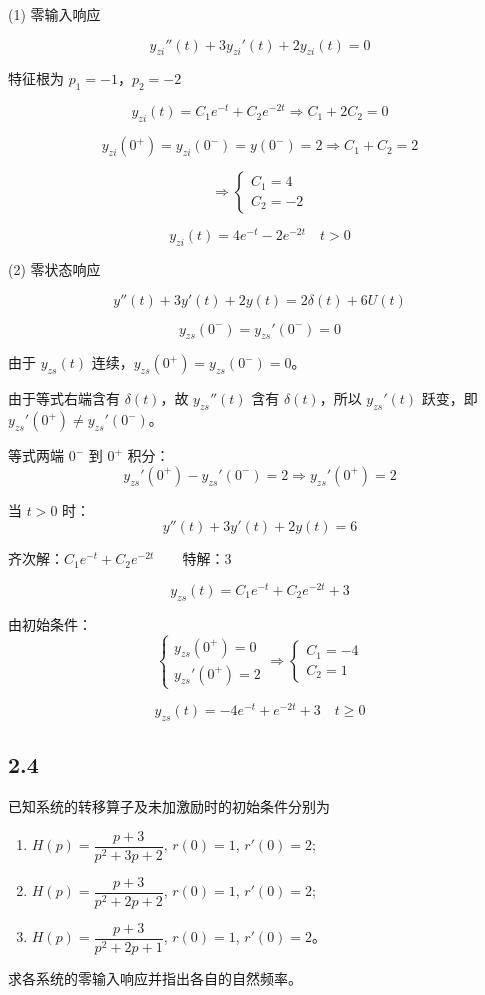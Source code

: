 \documentclass[UTF8]{ctexart}
\begin{document}
\begin{solution}
(1) 零输入响应

$$
y_{zi}''(t) + 3y_{zi}'(t) + 2y_{zi}(t) = 0
$$

特征根为 $p_1 = -1$，$p_2 = -2$

$$
y_{zi}(t) = C_1 e^{-t} + C_2 e^{-2t} \Rightarrow C_1 + 2C_2 = 0
$$

$$
y_{zi}(0^+) = y_{zi}(0^-) = y(0^-) = 2 \Rightarrow C_1 + C_2 = 2
$$

$$
\Rightarrow \begin{cases} C_1 = 4 \\ C_2 = -2 \end{cases}
$$

$$
y_{zi}(t) = 4e^{-t} - 2e^{-2t} \quad t > 0
$$

(2) 零状态响应

$$
y''(t) + 3y'(t) + 2y(t) = 2\delta(t) + 6U(t)
$$

$$
y_{zs}(0^-) = y_{zs}'(0^-) = 0
$$

由于 $y_{zs}(t)$ 连续，$y_{zs}(0^+) = y_{zs}(0^-) = 0$。

由于等式右端含有 $\delta(t)$，故 $y_{zs}''(t)$ 含有 $\delta(t)$，所以 $y_{zs}'(t)$ 跃变，即 $y_{zs}'(0^+) \neq y_{zs}'(0^-)$。

等式两端 $0^-$ 到 $0^+$ 积分：
$$
y_{zs}'(0^+) - y_{zs}'(0^-) = 2 \Rightarrow y_{zs}'(0^+) = 2
$$

当 $t > 0$ 时：
$$
y''(t) + 3y'(t) + 2y(t) = 6
$$

齐次解：$C_1 e^{-t} + C_2 e^{-2t}$　　特解：$3$

$$
y_{zs}(t) = C_1 e^{-t} + C_2 e^{-2t} + 3
$$

由初始条件：
$$
\begin{cases} y_{zs}(0^+) = 0 \\ y_{zs}'(0^+) = 2 \end{cases} \Rightarrow \begin{cases} C_1 = -4 \\ C_2 = 1 \end{cases}
$$

$$
y_{zs}(t) = -4e^{-t} + e^{-2t} + 3 \quad t \geq 0
$$
\end{solution}

\subsection{2.4}

\begin{problem}
已知系统的转移算子及未加激励时的初始条件分别为
\begin{enumerate}
    \item $H(p)=\dfrac{p+3}{p^2+3p+2}$, $r(0)=1$, $r'(0)=2$;
    \item $H(p)=\dfrac{p+3}{p^2+2p+2}$, $r(0)=1$, $r'(0)=2$;
    \item $H(p)=\dfrac{p+3}{p^2+2p+1}$, $r(0)=1$, $r'(0)=2$。
\end{enumerate}
求各系统的零输入响应并指出各自的自然频率。
\end{problem}
\end{document}
